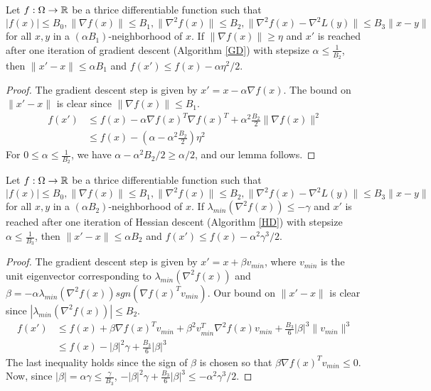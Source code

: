 \begin{lemma}\label{GradDecrease}		
Let $f :\Omega \to {\mathbb{R}}$ be a thrice differentiable function such that $|f(x)| \leq B_0, \|\nabla f(x)\| \leq B_1, \|\nabla^2 f(x)\| \leq B_2,\|\nabla^2f (x)-\nabla^2L(y)\| \leq B_3\|x - y\|$ for all $x,y$ in a $(\alpha B_1)$-neighborhood of $x$. If $\|\nabla f (x) \|\geq \eta$ and $x'$ is reached after one iteration of gradient descent (Algorithm \ref{GD}) with stepsize $\alpha \leq \frac{1}{B_2}$, then $\|x' - x\| \leq \alpha B_1$ and $f(x') \leq f(x) - \alpha\eta^2/2$.
\end{lemma} 

\begin{proof}
The gradient descent step is given by $x' = x - \alpha \nabla f(x)$. The bound on $\|x' - x\|$ is clear since $\|\nabla f(x) \| \leq B_1$.
\begin{align*}
f(x') &\leq f(x) - \alpha \nabla f(x)^T\nabla f(x)^T + \alpha^2\frac{B_2}{2} \|\nabla f(x)\|^2 \\
&\leq f(x) - (\alpha - \alpha^2 \frac{B_2}{2}) \eta^2 
\end{align*}
For $0 \leq \alpha \leq \frac{1}{B_2}$, we have $\alpha - \alpha^2B_2/2 \geq \alpha/2$, and our lemma follows.
\end{proof}

\begin{lemma}\label{HessianDecrease}
Let $f :\Omega \to {\mathbb{R}}$ be a thrice differentiable function such that $|f(x)| \leq B_0, \|\nabla f(x)\| \leq B_1, \|\nabla^2 f(x)\| \leq B_2,\|\nabla^2f (x)-\nabla^2L(y)\| \leq B_3\|x - y\|$ for all $x,y$ in a $(\alpha B_2)$-neighborhood of $x$. If $\lambda_{min}(\nabla^2 f (x)) \leq -\gamma$ and $x'$ is reached after one iteration of Hessian descent (Algorithm \ref{HD}) with stepsize $\alpha \leq \frac{1}{B_3}$, then $\|x' - x\| \leq \alpha B_2$ and $f(x') \leq f(x) - \alpha^2 \gamma^3/2$.
\end{lemma}

\begin{proof}
The gradient descent step is given by $x' = x + \beta v_{min}$, where $v_{min}$ is the unit eigenvector corresponding to $\lambda_{min}(\nabla^2f(x))$ and $\beta = -\alpha\lambda_{min}(\nabla^2 f(x))sgn(\nabla f(x)^Tv_{min})$. Our bound on $\|x' - x\|$ is clear since $|\lambda_{min}(\nabla^2 f(x))| \leq B_2$.
\begin{align*}
f(x') &\leq f(x) + \beta\nabla f(x)^Tv_{min} + \beta^2 v_{min}^T\nabla^2f(x)v_{min} + \frac{B_3}{6} |\beta|^3 \|v_{min}\|^3 \\
&\leq f(x) - |\beta|^2 \gamma + \frac{B_3}{6} |\beta|^3
\end{align*}
The last inequality holds since the sign of $\beta$ is chosen so that $\beta \nabla f(x)^Tv_{min} \leq 0$. Now, since $|\beta| = \alpha \gamma \leq \frac{\gamma}{B_3}$, $-|\beta|^2\gamma + \frac{B_3}{6} |\beta|^3 \leq - \alpha^2 \gamma^3/2$. 
\end{proof}


